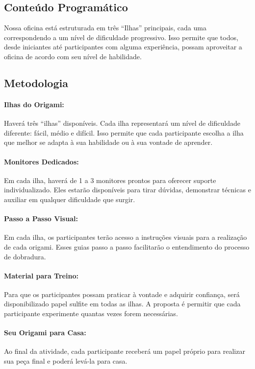 \documentclass[12pt,a4paper]{article}
\begin{document}
\subsection*{Conteúdo Programático}

Nossa oficina está estruturada em três ``Ilhas'' principais, cada uma
correspondendo a um nível de dificuldade progressivo. Isso permite que todos,
desde iniciantes até participantes com alguma experiência, possam aproveitar
a oficina de acordo com seu nível de habilidade.

\subsection*{Metodologia}

\paragraph{Ilhas do Origami:}
Haverá três ``ilhas'' disponíveis. Cada ilha representará um nível de
dificuldade diferente: fácil, médio e difícil. Isso permite que cada
participante escolha a ilha que melhor se adapta à sua habilidade ou à sua
vontade de aprender.

\paragraph{Monitores Dedicados:}
Em cada ilha, haverá de 1 a 3 monitores prontos para oferecer suporte
individualizado. Eles estarão disponíveis para tirar dúvidas, demonstrar
técnicas e auxiliar em qualquer dificuldade que surgir.

\paragraph{Passo a Passo Visual:}
Em cada ilha, os participantes terão acesso a instruções visuais para a
realização de cada origami. Esses guias passo a passo facilitarão o
entendimento do processo de dobradura.

\paragraph{Material para Treino:}
Para que os participantes possam praticar à vontade e adquirir confiança,
será disponibilizado papel sulfite em todas as ilhas. A proposta é permitir
que cada participante experimente quantas vezes forem necessárias.

\paragraph{Seu Origami para Casa:}
Ao final da atividade, cada participante receberá um papel próprio para
realizar sua peça final e poderá levá-la para casa.
\end{document}
